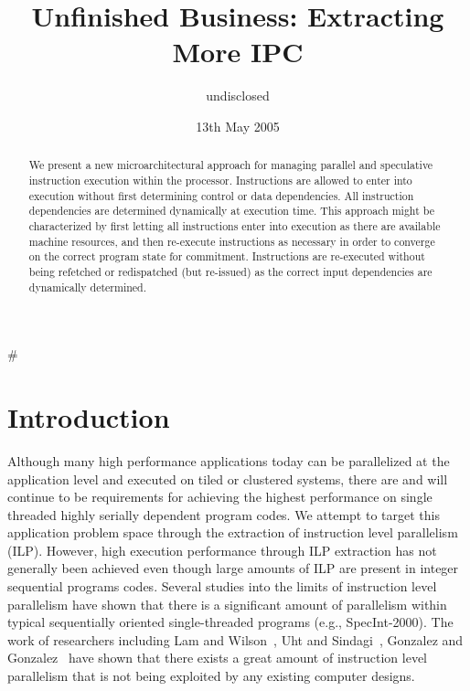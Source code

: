 #\documentclass[10pt,dvips]{article}
\begin{document}
%
%
\title{Unfinished Business: Extracting More IPC}
%
%
\author{
undisclosed
}
%
%
\date{13th May 2005}
%
\maketitle
%
%
%
\begin{abstract}
%
We present a new microarchitectural approach
for managing parallel and speculative instruction execution
within the processor.  
Instructions are allowed to enter into
execution without first determining control or data dependencies.
All instruction dependencies are 
determined dynamically at execution time.
This approach might be
characterized by first letting all instructions enter
into execution as there are available machine resources,
and then re-execute instructions as necessary in order
to converge on the correct program state for commitment.
Instructions are re-executed without being refetched or redispatched
(but re-issued)
as the correct input
dependencies are dynamically determined.
%
\end{abstract}
%
%
\section{Introduction}
%
Although many high performance applications today
can be parallelized at the application level 
and executed on tiled or clustered systems,
there are and will continue
to be requirements for achieving the highest performance
on single threaded highly serially dependent program codes.
We attempt to target this application problem space
through the extraction of instruction level parallelism (ILP).
However, 
high execution performance through ILP
extraction has not generally been achieved even though
large amounts of ILP are present in integer sequential programs
codes.
Several studies into the limits of instruction level 
parallelism have shown that there is 
a significant amount of parallelism within
typical sequentially oriented single-threaded programs
(e.g., SpecInt-2000).  
The work of researchers including 
Lam and Wilson~\cite{Lam92},
Uht and Sindagi~\cite{Uht95},
Gonzalez and Gonzalez~\cite{Gon97}
have shown that there exists a great amount of instruction level
parallelism that is not being exploited by any existing
computer designs.
\end{document}
